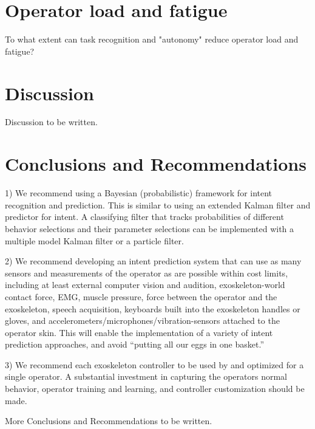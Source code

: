 \documentclass[letterpaper,12pt,fullpage]{article}
\begin{document}
\section{Operator load and fatigue}

To what extent can task recognition and "autonomy" reduce operator
load and fatigue?

\section{Discussion}

Discussion to be written.

\section{Conclusions and Recommendations}

1) We recommend using a Bayesian (probabilistic) framework for intent recognition
and prediction. This is similar to using an extended
Kalman filter and predictor for intent.
A classifying filter that tracks probabilities of different behavior selections
and their parameter selections can be implemented with a multiple model Kalman
filter or a particle filter.

2) We recommend developing an intent prediction system that can use
as many sensors and measurements of the operator as are possible within cost limits,
including at least external computer vision and audition, exoskeleton-world contact
force,
EMG, muscle pressure, force between the operator and the
exoskeleton,
speech acquisition, keyboards built into the exoskeleton handles or gloves,
and accelerometers/microphones/vibration-sensors attached to the operator skin.
This will enable the implementation of a variety of intent prediction approaches,
and avoid ``putting all our eggs in one basket.''

3) We recommend each exoskeleton controller
to be used by and optimized for a single operator.
A substantial investment in capturing the operators normal behavior,
operator training and learning, and controller customization should be made.

More Conclusions and Recommendations to be written.



\end{document}
